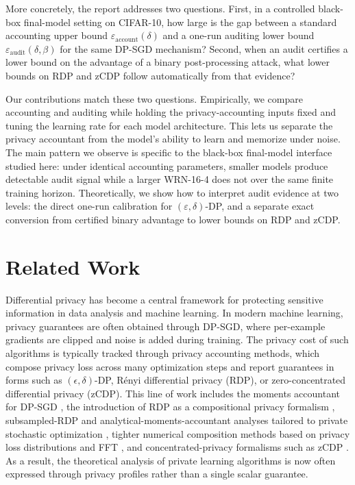 \documentclass[10pt]{article}
\newcommand{\eps}{\varepsilon}
\newcommand{\del}{\delta}
\begin{document}
More concretely, the report addresses two questions. First, in a controlled black-box final-model setting on CIFAR-10, how large is the gap between a standard accounting upper bound $\eps_{\mathrm{account}}(\del)$ and a one-run auditing lower bound $\eps_{\mathrm{audit}}(\del,\beta)$ for the same DP-SGD mechanism? Second, when an audit certifies a lower bound on the advantage of a binary post-processing attack, what lower bounds on RDP and zCDP follow automatically from that evidence?

Our contributions match these two questions. Empirically, we compare accounting and auditing while holding the privacy-accounting inputs fixed and tuning the learning rate for each model architecture. This lets us separate the privacy accountant from the model's ability to learn and memorize under noise. The main pattern we observe is specific to the black-box final-model interface studied here: under identical accounting parameters, smaller models produce detectable audit signal while a larger WRN-16-4 does not over the same finite training horizon. Theoretically, we show how to interpret audit evidence at two levels: the direct one-run calibration for $(\eps,\del)$-DP, and a separate exact conversion from certified binary advantage to lower bounds on RDP and zCDP.

\section{Related Work}

Differential privacy has become a central framework for protecting sensitive information in data analysis and machine learning. In modern machine learning, privacy guarantees are often obtained through DP-SGD, where per-example gradients are clipped and noise is added during training. The privacy cost of such algorithms is typically tracked through privacy accounting methods, which compose privacy loss across many optimization steps and report guarantees in forms such as $(\epsilon,\delta)$-DP, R\'enyi differential privacy (RDP), or zero-concentrated differential privacy (zCDP). This line of work includes the moments accountant for DP-SGD \cite{abadi2016deep}, the introduction of RDP as a compositional privacy formalism \cite{mironov2017renyi}, subsampled-RDP and analytical-moments-accountant analyses tailored to private stochastic optimization \cite{wang2019subsampled}, tighter numerical composition methods based on privacy loss distributions and FFT \cite{koskela2021tight}, and concentrated-privacy formalisms such as zCDP \cite{bun2016concentrated}. As a result, the theoretical analysis of private learning algorithms is now often expressed through privacy profiles rather than a single scalar guarantee.
\end{document}

